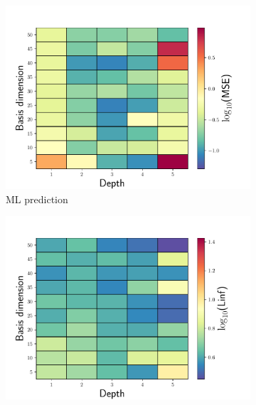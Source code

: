 \documentclass[3p,computermodern,10pt]{elsarticle}
\begin{document}
\begin{figure}
\begin{center}
\begin{subfigure}[t]{0.32\textwidth}
\includegraphics[trim={0cm 0cm 0cm 0cm},clip,width=1.0\linewidth]{code/burgers/synapse_models/basis_study/results/MSE_ML.pdf}
\caption{ML prediction}
\label{fig:burg_rom_results3}
\end{subfigure}
\begin{subfigure}[t]{0.32\textwidth}
\includegraphics[trim={0cm 0cm 0cm 0cm},clip,width=1.0\linewidth]{code/burgers/synapse_models/basis_study/results/Linf_LS.pdf}

\end{subfigure}
\end{center}
\end{figure}
\end{document}

